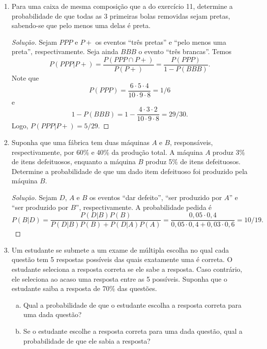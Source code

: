 \documentclass[../Notas.tex]{subfiles}
\begin{document}
\begin{enumerate}
\begin{proof}[Solução]
    \end{proof}
    \item Para uma caixa de mesma composição que a do exercício 11, determine a probabilidade de que todas as 3 primeiras bolas removidas sejam pretas, sabendo-se que pelo menos uma delas é preta.
    \begin{proof}[Solução]
        Sejam $PPP$ e $P+$ os eventos ``três pretas'' e ``pelo menos uma preta'', respectivamente. Seja ainda
        $BBB$ o evento ``três brancas''. Temos
        \[
        P(PPP|P+) = \frac{P(PPP\cap P+)}{P(P+)} = \frac{P(PPP)}{1 - P(BBB)}.
        \]
        Note que
        \[
        P(PPP) = \frac{6\cdot 5\cdot 4}{10\cdot 9\cdot 8} = 1/6
        \]
        e
        \[
        1 - P(BBB) = 1 - \frac{4\cdot 3\cdot 2}{10\cdot 9\cdot 8} = 29/30.
        \]
        Logo, $P(PPP|P+) = 5/29$.
    \end{proof}
    \item Suponha que uma fábrica tem duas máquinas $A$ e $B$, responsáveis, respectivamente, por 60\% e 40\% da produção total. A máquina $A$ produz 3\% de itens defeituosos, enquanto a máquina $B$ produz 5\% de itens defeituosos. Determine a probabilidade de que um dado item defeituoso foi produzido pela máquina $B$.
    \begin{proof}[Solução]
        Sejam $D$, $A$ e $B$ os eventos ``dar defeito'', ``ser produzido por $A$'' e ``ser produzido por $B$'',
        respectivamente. A probabilidade pedida é
        \[
        P(B|D) = \frac{P(D|B)P(B)}{P(D|B)P(B) + P(D|A)P(A)} 
               = \frac{0,05\cdot 0,4}{0,05\cdot 0,4 + 0,03\cdot 0,6}
               = 10/19.
        \]
    \end{proof}
    \item Um estudante se submete a um exame de múltipla escolha no qual cada questão tem 5 respostas possíveis das quais exatamente uma é correta. O estudante seleciona a resposta correta se ele sabe a resposta. Caso contrário, ele seleciona ao acaso uma resposta entre as 5 possíveis. Suponha que o estudante saiba a resposta de 70\% das questões.
    \begin{enumerate}[a)]
    \item Qual a probabilidade de que o estudante escolha a resposta correta para uma dada questão?
    \item Se o estudante escolhe a resposta correta para uma dada questão, qual a probabilidade de que ele sabia a resposta?

\end{enumerate}
\end{enumerate}
\end{document}

